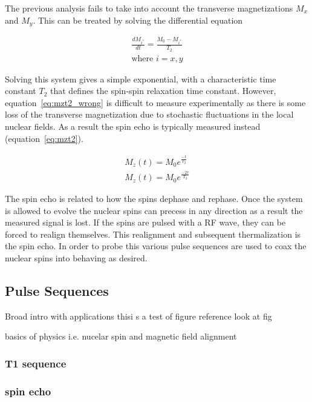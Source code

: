 \documentclass[
reprint,
amsmath,amssymb,
aps,
tikz,
border=5pt
]{revtex4-1}
\newcommand*{\tg}[1][2]{$T_#1$ }
\begin{document}
  The previous analysis fails to take into account the transverse magnetizations $M_x$ and $M_y$. This can be treated by solving the differential equation

  \begin{gather}
    \frac{dM_{i^*}}{dt} = \frac{M_0 - M_{i^*}}{T_2} \\
    \text{where } i = x , y
  \end{gather}


  Solving this system gives a simple exponential, with a characteristic time constant \tg that defines the spin-spin relaxation time constant. However, equation~\ref{eq:mzt2_wrong} is difficult to measure experimentally as there is some loss of the transverse magnetization due to stochastic fluctuations in the local nuclear fields. As a result the spin echo is typically measured instead (equation~\ref{eq:mzt2}). 

  \begin{gather}
    M_z(t) = M_0  e^\frac{-t}{T_2}  \label{eq:mzt2_wrong}\\
    M_z(t) = M_0  e^\frac{-2\tau}{T_2}  \label{eq:mzt2}
  \end{gather}

  The spin echo is related to how the spins dephase and rephase. Once the system is allowed to evolve the nuclear spins can precess in any direction as a result the measured signal is lost. If the spins are pulsed with a RF wave, they can be forced to realign themselves. This realignment and subsequent thermalization is the spin echo. In order to probe this various pulse sequences are used to coax the nuclear spins into behaving as desired.  

\subsection*{Pulse Sequences}


  Broad intro with applications thisi s a test of figure reference look at fig

  basics of physics i.e. nucelar spin and magnetic field alignment

\subsubsection*{T1 sequence}



\subsubsection*{spin echo}
\end{document}
